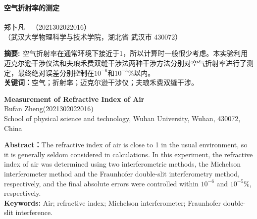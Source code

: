 \documentclass{WHUReport}
\newcommand{\name}{郑卜凡}
\newcommand{\stuid}{2021302022016}
\newcommand{\Name}{Bufan Zheng}
\newcommand{\newtitle}{空气折射率的测定}
\newcommand{\Title}{Measurement of Refractive Index of Air}
\begin{document}
\pagestyle{maincontent} 
%

\begin{center}
 \textbf{\newtitle}\\
~\\
 \kaishu \name \ \ （\stuid）\\
 \kaishu （武汉大学物理科学与技术学院，湖北省 武汉市 430072）\\
\end{center}
\textbf{摘\quad 要:}
空气折射率在通常环境下接近于1，所以计算时一般很少考虑。本实验利用迈克尔逊干涉仪法和夫琅禾费双缝干涉法两种干涉方法分别对空气折射率进行了测定，最终绝对误差分别控制在$10^{-6}$和$10^{-5}\%$以内。\\
\textbf{关键词：}空气；折射率；迈克尔逊干涉仪；夫琅禾费双缝干涉。
~\\
\begin{center}
	\textbf{\Title}\\
	 \Name\quad (\stuid)\\
	 School of physical science and technology, Wuhan University, Wuhan, 430072, China
\end{center}

\textbf{Abstract：}The refractive index of air is close to 1 in the usual environment, so it is generally seldom considered in calculations. In this experiment, the refractive index of air was determined using two interferometric methods, the Michelson interferometer method and the Fraunhofer double-slit interferometry method, respectively, and the final absolute errors were controlled within $10^{-6}$ and $10^{-5}\%$, respectively.\\
\textbf{Keywords: }Air; refractive index; Michelson interferometer; Fraunhofer double-slit interference.
\end{document}
